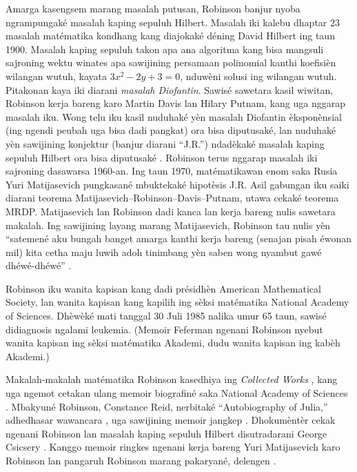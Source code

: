 \documentclass[../../../include/open-logic-section]{subfiles}
\begin{document}
Amarga kasengsem marang masalah
putusan, Robinson banjur nyoba
ngrampungaké masalah kaping sepuluh
Hilbert. Masalah iki kalebu
dhaptar 23 masalah matématika
kondhang kang diajokaké déning
David Hilbert ing taun 1900.
Masalah kaping sepuluh takon
apa ana algoritma kang bisa
mangsuli sajroning wektu winates
apa sawijining persamaan
polinomial kanthi koefisièn
wilangan wutuh, kayata
$3x^2 - 2y +3 = 0$,
nduwèni solusi ing wilangan
wutuh. Pitakonan kaya iki
diarani \emph{masalah Diofantin}.
Sawisé sawetara kasil wiwitan,
Robinson kerja bareng karo
Martin Davis lan Hilary Putnam,
kang uga nggarap masalah iku.
Wong telu iku kasil nuduhaké
yèn masalah Diofantin
èksponènsial (ing ngendi
peubah uga bisa dadi pangkat)
ora bisa diputusaké, lan
nuduhaké yèn sawijining
konjektur (banjur diarani
``J.R.'') ndadèkaké
masalah kaping sepuluh
Hilbert ora bisa diputusaké
\citep{DavisPutnamRobinson1961}.
Robinson terus nggarap
masalah iki sajroning
dasawarsa 1960-an. Ing taun
1970, matématikawan enom
saka Rusia Yuri Matijasevich
pungkasané mbuktekaké
hipotèsis J.R. Asil
gabungan iku saiki diarani
teorema
Matijasevich--Robinson--Davis--Putnam,
utawa cekaké teorema MRDP.
Matijasevich lan Robinson
dadi kanca lan kerja bareng
nulis sawetara makalah.
Ing sawijining layang
marang Matijasevich,
Robinson tau nulis yèn
``satemené aku bungah
banget amarga kanthi
kerja bareng (senajan
pisah éwonan mil) kita
cetha maju luwih adoh
tinimbang yèn saben
wong nyambut gawé
dhéwé-dhéwé''
\citep[45]{Matijasevich1992}.

Robinson iku wanita kapisan
kang dadi présidhèn
American Mathematical
Society, lan wanita
kapisan kang kapilih
ing sèksi matématika
National Academy
of Sciences. Dhèwèké
mati tanggal 30 Juli
1985 nalika umur 65
taun, sawisé
didiagnosis ngalami
leukemia.
(Memoir Feferman ngenani Robinson nyebut wanita kapisan ing sèksi matématika Akademi, dudu wanita kapisan ing kabèh Akademi.)

\begin{reading}
Makalah-makalah matématika
Robinson kasedhiya ing
\textit{Collected
  Works} \citep{Robinson1996},
kang uga ngemot cetakan
ulang memoir biografiné
saka National Academy of
Sciences
\citep{Feferman1994}.
Mbakyuné Robinson,
Constance Reid, nerbitaké
``Autobiography of Julia,''
adhedhasar wawancara
\citep{Reid1986},
uga sawijining memoir
jangkep \citep{Reid1996}.
Dhokumèntèr cekak
ngenani Robinson lan
masalah kaping sepuluh
Hilbert disutradarani
George Csicsery
\citep{Csicsery2016}.
Kanggo memoir ringkes
ngenani kerja bareng
Yuri Matijasevich karo
Robinson lan pangaruh
Robinson marang pakaryané,
delengen
\citep{Matijasevich1992}.
\end{reading}
\end{document}
